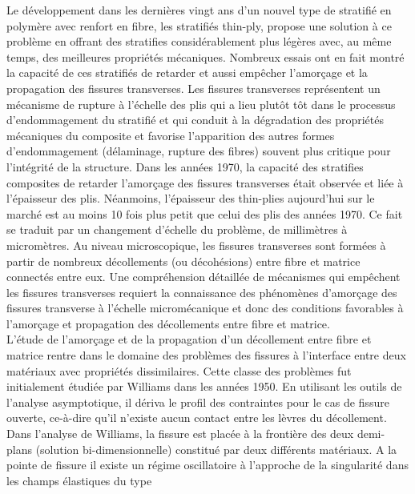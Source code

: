 Le d\'eveloppement dans les derni\`eres vingt ans d'un nouvel type de stratifi\'e en polym\`ere avec renfort en fibre, les stratifi\'es thin-ply, propose une solution \`a ce probl\`eme en offrant des stratifies consid\'erablement plus l\'eg\`eres avec, au m\^eme temps, des meilleures propri\'et\'es m\'ecaniques. Nombreux essais ont en fait montr\'e la capacit\'e de ces stratifi\'es de retarder et aussi emp\^echer l'amor\c{c}age et la propagation des fissures transverses. Les fissures transverses repr\'esentent un m\'ecanisme de rupture \`a l'\'echelle des plis qui a lieu plut\^ot t\^ot dans le processus d'endommagement du stratifi\'e et qui conduit \`a la d\'egradation des propri\'et\'es m\'ecaniques du composite et favorise l'apparition des autres formes d'endommagement (d\'elaminage, rupture des fibres) souvent plus critique pour l'int\'egrit\'e de la structure. Dans les ann\'ees 1970, la capacit\'e des stratifies composites de retarder l'amor\c{c}age des fissures transverses \'etait observ\'ee et li\'ee \`a l'\'epaisseur des plis. N\'eanmoins, l'\'epaisseur des thin-plies aujourd'hui sur le march\'e est au moins 10 fois plus petit que celui des plis des ann\'ees 1970. Ce fait se traduit par un changement d'\'echelle du probl\`eme, de millim\`etres \`a microm\`etres. Au niveau microscopique, les fissures transverses sont form\'ees \`a partir de nombreux d\'ecollements (ou d\'ecoh\'esions) entre fibre et matrice connect\'es entre eux. Une compr\'ehension d\'etaill\'ee de m\'ecanismes qui emp\^echent les fissures transverses requiert la connaissance des ph\'enom\`enes d'amor\c{c}age des fissures transverse \`a l'\'echelle microm\'ecanique et donc des conditions favorables \`a l'amor\c{c}age et propagation des d\'ecollements entre fibre et matrice.\\

L'\'etude de l'amor\c{c}age et de la propagation d'un d\'ecollement entre fibre et matrice rentre dans le domaine des probl\`emes des fissures \`a l'interface entre deux mat\'eriaux avec propri\'et\'es dissimilaires. Cette classe des probl\`emes fut initialement \'etudi\'ee par Williams dans les ann\'ees 1950. En utilisant les outils de l'analyse asymptotique, il d\'eriva le profil des contraintes pour le cas de fissure ouverte, ce-\`a-dire qu'il n'existe aucun contact entre les l\`evres du d\'ecollement. Dans l'analyse de Williams, la fissure est plac\'ee \`a la fronti\`ere des deux demi-plans (solution bi-dimensionnelle) constitu\'e par deux diff\'erents mat\'eriaux. A la pointe de fissure il existe un r\'egime oscillatoire \`a l'approche de la singularit\'e dans les champs \'elastiques du type

